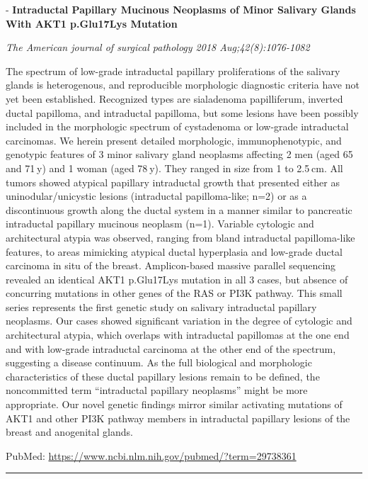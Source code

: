 \documentclass[]{article}
\begin{document}
 - \textbf{Intraductal Papillary Mucinous Neoplasms of Minor Salivary
Glands With AKT1 p.Glu17Lys Mutation}

\emph{The American journal of surgical pathology 2018
Aug;42(8):1076-1082}

The spectrum of low-grade intraductal papillary proliferations of the
salivary glands is heterogenous, and reproducible morphologic diagnostic
criteria have not yet been established. Recognized types are sialadenoma
papilliferum, inverted ductal papilloma, and intraductal papilloma, but
some lesions have been possibly included in the morphologic spectrum of
cystadenoma or low-grade intraductal carcinomas. We herein present
detailed morphologic, immunophenotypic, and genotypic features of 3
minor salivary gland neoplasms affecting 2 men (aged 65 and 71 y) and 1
woman (aged 78 y). They ranged in size from 1 to 2.5 cm. All tumors
showed atypical papillary intraductal growth that presented either as
uninodular/unicystic lesions (intraductal papilloma-like; n=2) or as a
discontinuous growth along the ductal system in a manner similar to
pancreatic intraductal papillary mucinous neoplasm (n=1). Variable
cytologic and architectural atypia was observed, ranging from bland
intraductal papilloma-like features, to areas mimicking atypical ductal
hyperplasia and low-grade ductal carcinoma in situ of the breast.
Amplicon-based massive parallel sequencing revealed an identical AKT1
p.Glu17Lys mutation in all 3 cases, but absence of concurring mutations
in other genes of the RAS or PI3K pathway. This small series represents
the first genetic study on salivary intraductal papillary neoplasms. Our
cases showed significant variation in the degree of cytologic and
architectural atypia, which overlaps with intraductal papillomas at the
one end and with low-grade intraductal carcinoma at the other end of the
spectrum, suggesting a disease continuum. As the full biological and
morphologic characteristics of these ductal papillary lesions remain to
be defined, the noncommitted term ``intraductal papillary neoplasms''
might be more appropriate. Our novel genetic findings mirror similar
activating mutations of AKT1 and other PI3K pathway members in
intraductal papillary lesions of the breast and anogenital glands.

PubMed: \url{https://www.ncbi.nlm.nih.gov/pubmed/?term=29738361}

{}

{}

\begin{center}\rule{0.5\linewidth}{\linethickness}\end{center}
\end{document}
